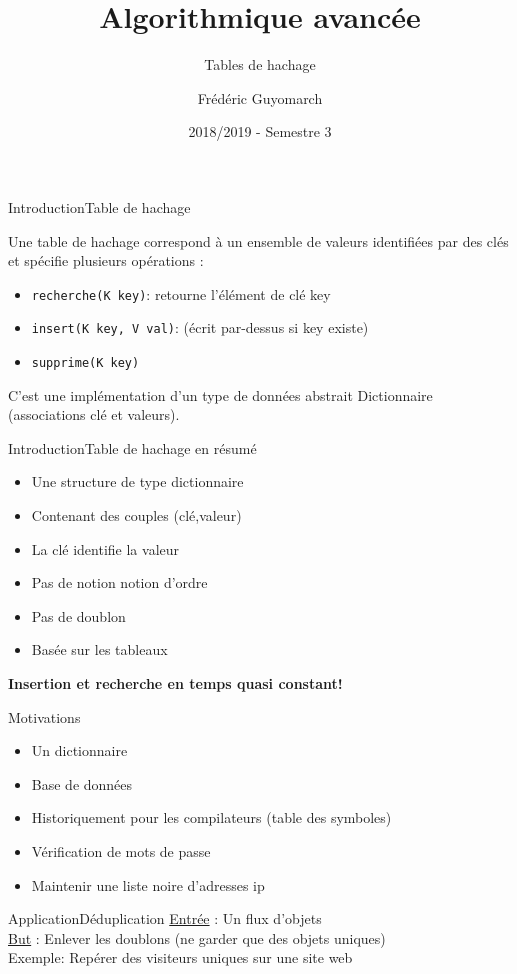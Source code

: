 \documentclass[12pt,a4paper]{beamer}
\title{\textbf{Algorithmique avancée}}
\subtitle{Tables de hachage}
\author{Frédéric Guyomarch}
\date{2018/2019 - Semestre 3}
\institute %
{

  Université de Lille1\\
  IUT-A de Lille

}
\newcommand{\hl}[1]{\textcolor{blueemph}{#1}}
\begin{document}
\begin{frame}
\titlepage
\end{frame}

\begin{frame}{Introduction}{Table de hachage}

Une table de hachage correspond à un ensemble de valeurs identifiées par des clés et spécifie plusieurs opérations : 
\begin{itemize}
\item \texttt{recherche(K key)}: retourne l'élément de clé key
\item \texttt{insert(K key, V val)}: (écrit par-dessus si key existe) 
\item \texttt{supprime(K key)}
\end{itemize}
C'est une implémentation d'un type de données abstrait Dictionnaire (associations clé et valeurs).
\end{frame}


\begin{frame}{Introduction}{Table de hachage en résumé}

\begin{itemize}
\item Une structure de type dictionnaire
\item Contenant des couples (clé,valeur)
\item La clé identifie la valeur 
\item Pas de notion notion d'ordre
\item Pas de doublon
\item Basée sur les tableaux
\end{itemize}
\pause 
 \hl{\textbf{\Smiley Insertion et recherche en temps quasi constant!}}
\end{frame}


\begin{frame}{Motivations}{}

\begin{itemize}
\item Un dictionnaire
\item Base de données
\item Historiquement pour les compilateurs (table des symboles)
\item Vérification de mots de passe
\item Maintenir une liste noire d'adresses ip
\end{itemize}

\end{frame}

\begin{frame}[t]{Application}{Déduplication}
\underline{Entrée} : Un flux d'objets\\
\underline{But} : Enlever les doublons (ne garder que des objets uniques)\\
Exemple: Repérer des visiteurs uniques sur une site web
\end{frame}
\end{document}

